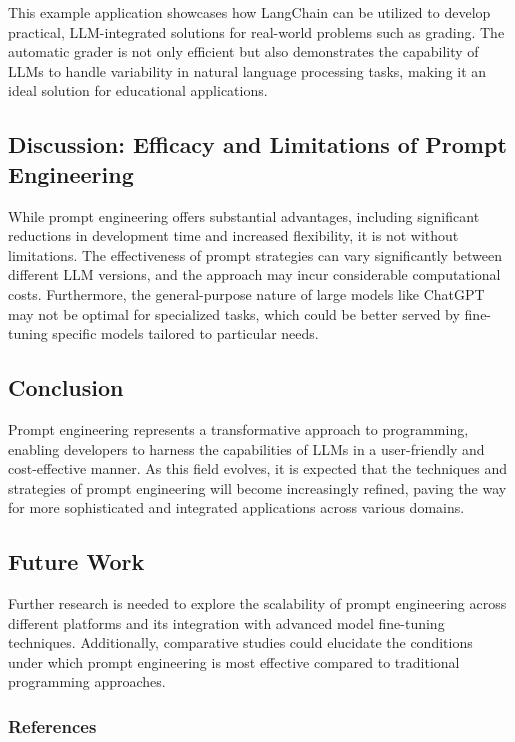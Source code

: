 \documentclass[
]{agujournal2019}
\begin{document}
This example application showcases how LangChain can be utilized to
develop practical, LLM-integrated solutions for real-world problems such
as grading. The automatic grader is not only efficient but also
demonstrates the capability of LLMs to handle variability in natural
language processing tasks, making it an ideal solution for educational
applications.

\subsection{Discussion: Efficacy and Limitations of Prompt
Engineering}\label{discussion-efficacy-and-limitations-of-prompt-engineering}

While prompt engineering offers substantial advantages, including
significant reductions in development time and increased flexibility, it
is not without limitations. The effectiveness of prompt strategies can
vary significantly between different LLM versions, and the approach may
incur considerable computational costs. Furthermore, the general-purpose
nature of large models like ChatGPT may not be optimal for specialized
tasks, which could be better served by fine-tuning specific models
tailored to particular needs.

\subsection{Conclusion}\label{conclusion}

Prompt engineering represents a transformative approach to programming,
enabling developers to harness the capabilities of LLMs in a
user-friendly and cost-effective manner. As this field evolves, it is
expected that the techniques and strategies of prompt engineering will
become increasingly refined, paving the way for more sophisticated and
integrated applications across various domains.

\subsection{Future Work}\label{future-work}

Further research is needed to explore the scalability of prompt
engineering across different platforms and its integration with advanced
model fine-tuning techniques. Additionally, comparative studies could
elucidate the conditions under which prompt engineering is most
effective compared to traditional programming approaches.

\subsubsection{References}\label{references}
\end{document}
